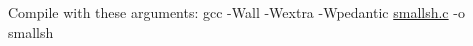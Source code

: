 Compile with these arguments\+: gcc -\/Wall -\/Wextra -\/Wpedantic \mbox{\hyperlink{smallsh_8c}{smallsh.\+c}} -\/o smallsh 